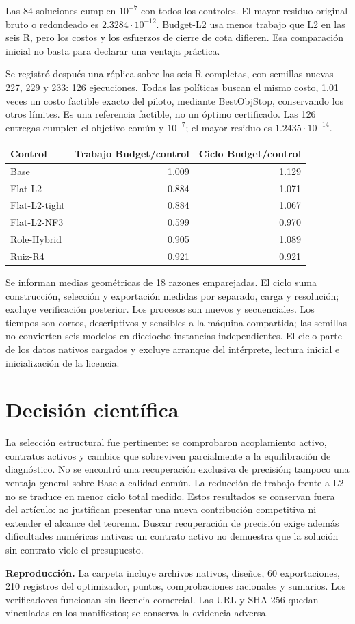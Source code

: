\documentclass[10pt,a4paper]{article}
\begin{document}
Las 84 soluciones cumplen $10^{-7}$ con todos los controles. El mayor residuo
original bruto o redondeado es $2.3284\cdot10^{-12}$. Budget-L2 usa menos
trabajo que L2 en las seis R, pero los costos y los esfuerzos de cierre de cota
difieren. Esa comparación inicial no basta para declarar una ventaja práctica.

Se registró después una réplica sobre las seis R completas, con semillas nuevas
227, 229 y 233: 126 ejecuciones. Todas las políticas buscan el mismo costo,
1.01 veces un costo factible exacto del piloto, mediante BestObjStop, conservando
los otros límites. Es una referencia factible, no un óptimo certificado.
Las 126 entregas cumplen el objetivo común y $10^{-7}$; el mayor residuo es
$1.2435\cdot10^{-14}$.

\begin{center}\small
\begin{tabular}{lrr}\toprule
Control&Trabajo Budget/control&Ciclo Budget/control\\\midrule
Base&1.009&1.129\\
Flat-L2&0.884&1.071\\
Flat-L2-tight&0.884&1.067\\
Flat-L2-NF3&0.599&0.970\\
Role-Hybrid&0.905&1.089\\
Ruiz-R4&0.921&0.921\\\bottomrule
\end{tabular}
\end{center}
Se informan medias geométricas de 18 razones emparejadas. El ciclo suma
construcción, selección y exportación medidas por separado, carga y resolución;
excluye verificación posterior. Los procesos son nuevos y secuenciales. Los
tiempos son cortos, descriptivos y sensibles a la máquina compartida; las
semillas no convierten seis modelos en dieciocho instancias independientes.
El ciclo parte de los datos nativos cargados y excluye arranque del intérprete,
lectura inicial e inicialización de la licencia.

\section{Decisión científica}
La selección estructural fue pertinente: se comprobaron acoplamiento activo,
contratos activos y cambios que sobreviven parcialmente a la equilibración
de diagnóstico. No se encontró una recuperación exclusiva de precisión;
tampoco una ventaja general sobre Base a calidad común. La reducción de
trabajo frente a L2 no se traduce en menor ciclo total medido.
Estos resultados se conservan fuera del artículo: no justifican presentar
una nueva contribución competitiva ni extender el alcance del teorema.
Buscar recuperación de precisión exige además dificultades numéricas nativas:
un contrato activo no demuestra que la solución sin contrato viole el presupuesto.

\noindent\textbf{Reproducción.} La carpeta incluye archivos nativos, diseños,
60 exportaciones, 210 registros del optimizador, puntos, comprobaciones racionales
y sumarios. Los verificadores funcionan sin licencia comercial. Las URL y
SHA-256 quedan vinculadas en los manifiestos; se conserva la evidencia adversa.
\end{document}
